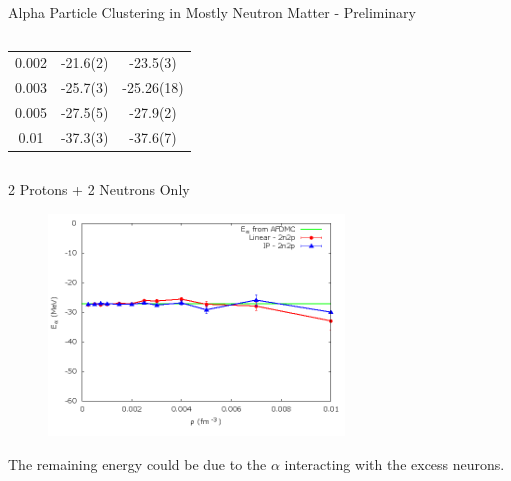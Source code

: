 \documentclass{beamer}
\begin{document}
\begin{frame}{\large Alpha Particle Clustering in Mostly Neutron Matter - Preliminary}
\begin{itemize}
\begin{columns}
\begin{column}{0.4\textwidth}
\begin{table}[h!]
\begin{tabular}{ccc}
         0.002    & -21.6(2)  & -23.5(3)  \\
         0.003    & -25.7(3)  & -25.26(18)\\
         0.005    & -27.5(5)  & -27.9(2)  \\
         0.01     & -37.3(3)  & -37.6(7)  \\
         \hline \hline
      \end{tabular}
   \end{table}
   \end{column}
   \hspace{0.6cm}
   \end{columns}
\end{itemize}
\end{frame}

\begin{frame}{2 Protons + 2 Neutrons Only}
\begin{figure}[h!]
   \centering
   \includegraphics[width=0.7\textwidth]{../figures/2n2p.png}
\end{figure}
The remaining energy could be due to the $\alpha$ interacting with the excess neurons.
\end{frame}
\end{document}
